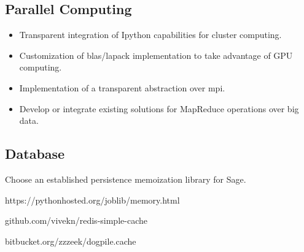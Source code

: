 \subsection{Parallel Computing}

\begin{itemize}
 \item Transparent integration of Ipython capabilities for cluster computing.
 \item Customization of blas/lapack implementation to take advantage of GPU computing.
 \item Implementation of a transparent abstraction over mpi.
 \item Develop or integrate existing solutions for MapReduce operations over big data.
\end{itemize}

\subsection{Database}

Choose an established persistence memoization library for Sage.

https://pythonhosted.org/joblib/memory.html

github.com/vivekn/redis-simple-cache

bitbucket.org/zzzeek/dogpile.cache
